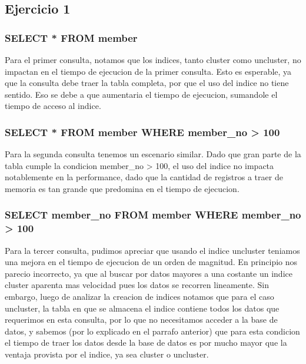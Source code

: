 \subsection{Ejercicio 1}

\subsubsection{SELECT * FROM member}
Para el primer consulta, notamos que los indices, tanto cluster como uncluster, no impactan en el tiempo de
ejecucion de la primer consulta. Esto es esperable, ya que la consulta  debe traer la tabla completa,
por que el uso del indice no tiene sentido. Eso se debe a que aumentaria el tiempo de ejecucion, sumandole el tiempo de  
acceso al indice.

\subsubsection{SELECT * FROM member WHERE member_no > 100}
Para la segunda consulta tenemos un escenario similar. Dado que gran parte de la tabla cumple la 
condicion member_no > 100, el uso del indice no impacta notablemente en la performance, dado 
que la cantidad de registros a traer de memoria es tan grande que predomina en el 
tiempo de ejecucion.

\subsubsection{SELECT member_no FROM member WHERE member_no > 100}
Para la tercer consulta, pudimos apreciar que usando el indice uncluster teniamos una mejora 
en el tiempo de ejecucion de un orden de magnitud. En principio nos parecio incorrecto, ya que
al buscar por datos mayores a una costante un indice cluster aparenta mas velocidad pues los datos 
se recorren lineamente. Sin embargo, luego de analizar la creacion de indices notamos que para el caso
uncluster, la tabla en que se almacena el indice contiene todos los datos que requerimos en esta consulta,
por lo que no necesitamos acceder a la base de datos, y sabemos (por lo explicado en el parrafo anterior) 
que para esta condicion el tiempo de traer los datos desde la base de datos es por mucho mayor que la ventaja
provista por el indice, ya sea cluster o uncluster.

